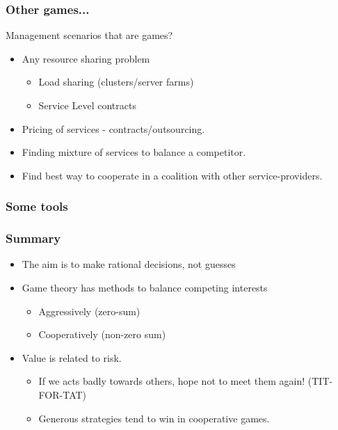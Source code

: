 \documentclass{beamer}
\begin{document}
\begin{frame}
\frametitle{Other games...}

Management scenarios that are games?\vspace{0.3cm}
\begin{itemize}
\item Any resource sharing problem\vspace{0.3cm}

\begin{itemize}
\item Load sharing (clusters/server farms)
\item Service Level contracts
\end{itemize}

\item Pricing of services - contracts/outsourcing.\vspace{0.3cm}

\item Finding mixture of services to balance a competitor.\vspace{0.3cm}

\item Find best way to cooperate in a coalition with other service-providers.

\end{itemize}
\end{frame}



\begin{frame}
\frametitle{Some tools}

\end{frame}


\begin{frame}
\frametitle{Summary}


\begin{itemize}
\item The aim is to make rational decisions, not guesses\vspace{0.3cm}

\item Game theory has methods to balance competing interests

\begin{itemize}
\item Aggressively (zero-sum)
\item Cooperatively (non-zero sum)\vspace{0.3cm}
\end{itemize}

\item Value is related to risk. 
\begin{itemize}
\item If we acts badly towards others, hope not to meet them again! (TIT-FOR-TAT)
\item Generous strategies tend to win in cooperative games.
\end{itemize}
\end{itemize}
\end{frame}
\end{document}
